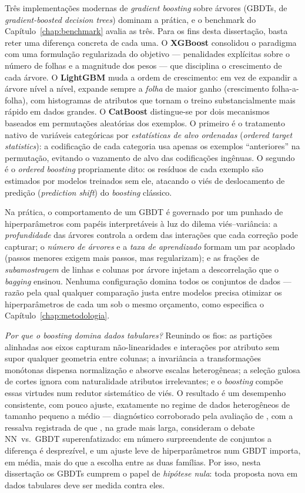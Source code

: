 Três implementações modernas de \emph{gradient boosting} sobre árvores
(GBDTs, de \emph{gradient-boosted decision trees}) dominam a prática, e o
benchmark do Capítulo~\ref{chap:benchmark} avalia as três. Para os fins desta dissertação,
basta reter uma diferença concreta de cada uma. O \textbf{XGBoost}
\citep{chen2016} consolidou o paradigma com uma formulação regularizada do
objetivo --- penalidades explícitas sobre o número de folhas e a magnitude
dos pesos --- que disciplina o crescimento de cada árvore. O
\textbf{LightGBM} \citep{ke2017} muda a ordem de crescimento: em vez de
expandir a árvore nível a nível, expande sempre a \emph{folha} de maior
ganho (crescimento folha-a-folha), com histogramas de atributos que tornam
o treino substancialmente mais rápido em dados grandes. O
\textbf{CatBoost} \citep{prokhorenkova2018} distingue-se por dois
mecanismos baseados em permutações aleatórias dos exemplos. O primeiro
é o tratamento nativo de variáveis categóricas por \emph{estatísticas
de alvo ordenadas} (\emph{ordered target statistics}): a codificação
de cada categoria usa apenas os exemplos ``anteriores'' na permutação,
evitando o vazamento de alvo das codificações ingênuas. O segundo é o
\emph{ordered boosting} propriamente dito: os resíduos de cada
exemplo são estimados por modelos treinados sem ele, atacando o viés
de deslocamento de predição (\emph{prediction shift}) do
\emph{boosting} clássico.

Na prática, o comportamento de um GBDT é
governado por um punhado de hiperparâmetros com papéis interpretáveis à luz
do dilema viés--variância: a \emph{profundidade} das árvores controla a
ordem das interações que cada correção pode capturar; o \emph{número de
árvores} e a \emph{taxa de aprendizado} formam um par acoplado (passos
menores exigem mais passos, mas regularizam); e as frações de
\emph{subamostragem} de linhas e colunas por árvore injetam a
descorrelação que o \emph{bagging} ensinou. Nenhuma configuração domina
todos os conjuntos de dados --- razão pela qual qualquer comparação justa
entre modelos precisa otimizar os hiperparâmetros de cada um sob o mesmo
orçamento, como especifica o Capítulo~\ref{chap:metodologia}.

\emph{Por que o \emph{boosting} domina dados tabulares?} Reunindo os
fios: as partições alinhadas aos eixos capturam não-linearidades e
interações por atributo sem supor qualquer geometria entre colunas; a
invariância a transformações monótonas dispensa normalização e absorve
escalas heterogêneas; a seleção gulosa de cortes ignora com naturalidade
atributos irrelevantes; e o \emph{boosting} compõe essas virtudes num
redutor sistemático de viés. O resultado é um desempenho consistente, com
pouco ajuste, exatamente no regime de dados heterogêneos de tamanho pequeno
a médio --- diagnóstico corroborado pela avaliação de
\citet{grinsztajn2022}, com a ressalva registrada de que
\citet{mcelfresh2023}, na grade mais larga, consideram o debate
NN~vs.\ GBDT superenfatizado: em número surpreendente de conjuntos a
diferença é desprezível, e um ajuste leve de hiperparâmetros num GBDT
importa, em média, mais do que a escolha entre as duas famílias. Por isso, nesta dissertação os
GBDTs cumprem o papel de \emph{hipótese nula}: toda proposta nova em dados
tabulares deve ser medida contra eles.

